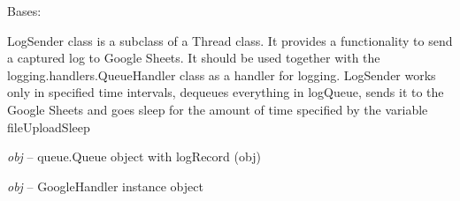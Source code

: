 \documentclass[letterpaper,10pt,english,openany]{sphinxmanual}
\begin{document}

\begin{fulllineitems}
\label{index:rpicameramon.telemetry.LogSender}
Bases: 

LogSender class is a subclass of a Thread class.
It provides a functionality to send a captured log to
Google Sheets. It should be used together with the
logging.handlers.QueueHandler class as a handler for logging.
LogSender works only in specified time intervals,
dequeues everything in logQueue, sends it
to the Google Sheets and goes sleep for the amount of time
specified by the variable fileUploadSleep

\begin{fulllineitems}
\label{index:rpicameramon.telemetry.LogSender.logQueue}
\emph{obj} -- queue.Queue object with logRecord (obj)

\end{fulllineitems}


\begin{fulllineitems}
\label{index:rpicameramon.telemetry.LogSender.enqueued}
\end{fulllineitems}


\begin{fulllineitems}
\label{index:rpicameramon.telemetry.LogSender.googleHandler}
\emph{obj} -- GoogleHandler instance object

\end{fulllineitems}


\begin{fulllineitems}
\label{index:rpicameramon.telemetry.LogSender.run}
\end{fulllineitems}


\end{fulllineitems}
\end{document}
